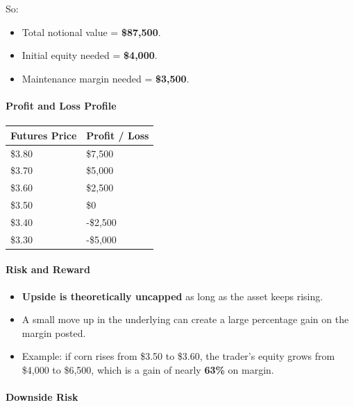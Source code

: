 \documentclass[12pt,openany]{book}
\begin{document}
So:

\begin{itemize}[leftmargin=*]
    \item Total notional value = \textbf{\$87,500}.
    \item Initial equity needed = \textbf{\$4,000}.
    \item Maintenance margin needed = \textbf{\$3,500}.
\end{itemize}

\paragraph{Profit and Loss Profile}

\begin{center}
\small
\begin{tabular}{|L{0.28\textwidth}|L{0.28\textwidth}|}
\hline
\textbf{Futures Price} & \textbf{Profit / Loss} \\ \hline
\$3.80 & \$7,500 \\ \hline
\$3.70 & \$5,000 \\ \hline
\$3.60 & \$2,500 \\ \hline
\$3.50 & \$0 \\ \hline
\$3.40 & -\$2,500 \\ \hline
\$3.30 & -\$5,000 \\ \hline
\end{tabular}
\end{center}

\paragraph{Risk and Reward}

\begin{itemize}[leftmargin=*]
    \item \textbf{Upside is theoretically uncapped} as long as the asset keeps rising.
    \item A small move up in the underlying can create a large percentage gain on the margin posted.
    \item Example: if corn rises from \$3.50 to \$3.60, the trader's equity grows from \$4,000 to \$6,500, which is a gain of nearly \textbf{63\%} on margin.
\end{itemize}

\paragraph{Downside Risk}
\end{document}

